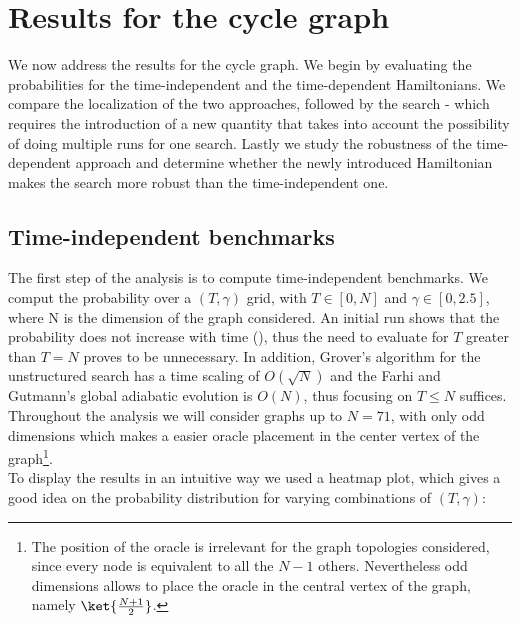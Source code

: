 \clearpage
\section{Results for the cycle graph}
We now address the results for the cycle graph. We begin by evaluating the probabilities for the time-independent and the time-dependent Hamiltonians. We compare the localization of the two approaches, followed by the search - which requires the introduction of a new quantity that takes into account the possibility of doing multiple runs for one search. Lastly we study the robustness of the time-dependent approach and determine whether the newly introduced Hamiltonian makes the search more robust than the time-independent one.
    \subsection{Time-independent benchmarks}
        The first step of the analysis is to compute time-independent benchmarks. We comput the probability over a $(T,\gamma)$ grid, with $T\in[0,N]$ and $\gamma\in[0,2.5]$, where N is the dimension of the graph considered. An initial run shows that the probability does not increase with time (), thus the need to evaluate for $T$ greater than $T=N$ proves to be unnecessary. In addition, Grover's algorithm for the unstructured search has a time scaling of $O(\sqrt{N})$ and the Farhi and Gutmann's global adiabatic evolution is $O(N)$, thus focusing on $T \leq N$ suffices.\\
        

        \clearpage
        \noindent
        Throughout the analysis we will consider graphs up to $N = 71$, with only odd dimensions which makes a easier oracle placement in the center vertex of the graph\footnote{The position of the oracle is irrelevant for the graph topologies considered, since every node is equivalent to all the $N-1$ others. Nevertheless odd dimensions allows to place the oracle in the central vertex of the graph, namely $\ket{\frac{N+1}{2}}$.}.  \\

        \noindent
        To display the results in an intuitive way we used a heatmap plot, which gives a good idea on the probability distribution for varying combinations of $(T,\gamma)$:
        

